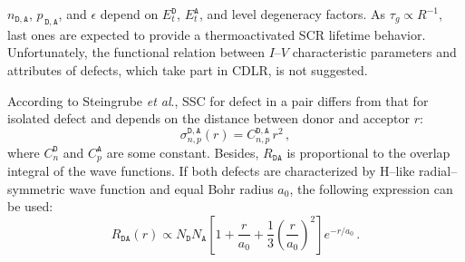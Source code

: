 \documentclass[aip,jap, amsmath,amssymb,reprint]{revtex4-1}
\begin{document}
$n_{\mathtt{D,A}}$, $p_{\,\mathtt{D,A}}$, and $\epsilon$ depend on $E_t^{\mathtt{D}}$, $E_t^{\mathtt{A}}$, and level degeneracy  factors.
As $\tau_g\propto R^{-1}$, last ones are expected to provide a thermoactivated SCR lifetime behavior.
Unfortunately, the functional relation between $I$--$V$ characteristic parameters and attributes of defects, which take part in CDLR, is not suggested.

According to Steingrube \emph{et al}.\cite{CDLR:JAP},
SSC for defect in a pair differs from that for isolated defect and depends on the distance between donor and acceptor $r$:
\begin{equation}
\label{eqSigma}
\sigma_{n,p}^{\mathtt{D,A}}(r)=C_{n,p}^{\mathtt{D,A}}\,r^2\,,
\end{equation}
where $C_{n}^{\mathtt{D}}$ and $C_{p}^{\mathtt{A}}$ are some constant.
Besides, $R_{\mathtt{DA}}$ is proportional to the overlap integral of the wave functions.
If both defects are characterized by H--like radial--symmetric wave function and equal Bohr radius $a_0$,
the following expression can be used: \cite{CDLR:JAP}
\begin{equation}
\label{eqRda}
R_{\mathtt{DA}} (r) \propto N_{\mathtt{D}}N_{\mathtt{A}}\left[1+\frac{r}{a_0}+\frac{1}{3}\left(\frac{r}{a_0}\right)^2\right]
   e^{-r/a_0}\,.
\end{equation}


\end{document}
